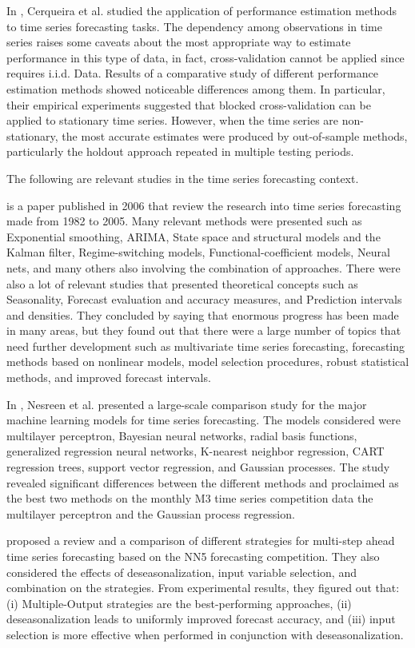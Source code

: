 In \cite{Cerqueira2020}, Cerqueira et al. studied the application of performance estimation methods to time series forecasting tasks.
The dependency among observations in time series raises some caveats about the most appropriate way to estimate performance in this type of data, in fact, cross-validation cannot be applied since requires i.i.d. Data.
Results of a comparative study of different performance estimation methods showed noticeable differences among them.
In particular, their empirical experiments suggested that blocked cross-validation can be applied to stationary time series.
However, when the time series are non-stationary, the most accurate estimates were produced by out-of-sample methods, particularly the holdout approach repeated in multiple testing periods.

The following are relevant studies in the time series forecasting context.

\cite{DEGOOIJER2006443} is a paper published in 2006 that review the research into time series forecasting made from 1982 to 2005.
Many relevant methods were presented such as Exponential smoothing, ARIMA, State space and structural models and the Kalman filter, Regime-switching models, Functional-coefficient models, Neural nets, and many others also involving the combination of approaches.
There were also a lot of relevant studies that presented theoretical concepts such as Seasonality, Forecast evaluation and accuracy measures, and Prediction intervals and densities.
They concluded by saying that enormous progress has been made in many areas, but they found out that there were a large number of topics that need further development such as multivariate time series forecasting, forecasting methods based on nonlinear models, model selection procedures, robust statistical methods, and improved forecast intervals.

In \cite{Nesreen2010}, Nesreen et al. presented a large-scale comparison study for the major machine learning models for time series forecasting.
The models considered were multilayer perceptron, Bayesian neural networks, radial basis functions, generalized regression neural networks, K-nearest neighbor regression, CART regression trees, support vector regression, and Gaussian processes.
The study revealed significant differences between the different methods and proclaimed as the best two methods on the monthly M3 time series competition data the multilayer perceptron and the Gaussian process regression.

\cite{BENTAIEB20127067} proposed a review and a comparison of different strategies for multi-step ahead time series forecasting based on the NN5 forecasting competition.
They also considered the effects of deseasonalization, input variable selection, and combination on the strategies.
From experimental results, they figured out that:
(i) Multiple-Output strategies are the best-performing approaches,
(ii) deseasonalization leads to uniformly improved forecast accuracy,
and (iii) input selection is more effective when performed in conjunction with deseasonalization.

